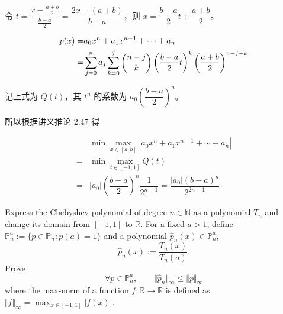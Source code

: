 \documentclass[lang=cn,a4paper,newtx,bibend=bibtex]{elegantpaper}
\begin{document}
\begin{solution}
  令 $t=\dfrac{x-\frac{a+b}2}{\frac{b-a}2}=\dfrac{2x-(a+b)}{b-a}$，则 $x=\dfrac{b-a}2t+\dfrac{a+b}2$。

  \begin{equation*}
  \begin{aligned}
    p(x) = & a_0x^n+a_1x^{n-1}+\cdots+a_n\\
    = & \sum_{j=0}^n a_j\sum_{k=0}^j \dbinom{n-j}k\left(\dfrac{b-a}{2} t\right)^k \left(\dfrac {a+b}2\right)^{n-j-k}
  \end{aligned}
  \end{equation*}
  
  记上式为 $Q(t)$，其 $t^n$ 的系数为 $a_0\left(\dfrac{b-a}2\right)^n$。
  
  所以根据讲义推论 2.47 得
  
  \begin{equation*}
  \begin{aligned}
    & \min \max_{x\in [a,b]} |a_0x^n+a_1x^{n-1}+\cdots+a_n|\\
    = & \min \max_{t\in [-1,1]} Q(t)\\
    = & |a_0|\left(\dfrac{b-a}2\right)^n\dfrac{1}{2^{n-1}} = \dfrac{|a_0|(b-a)^n}{2^{2n-1}}
  \end{aligned}
  \end{equation*}
\end{solution}

\begin{prob}
    Express the Chebyshev polynomial of degree $n\in\mathbb{N}$ as a polynomial $T_n$ and change its domain from $[-1,1]$ to $\mathbb{R}$. For a fixed $a>1$, define $\mathbb{P}_n^a := \{p\in\mathbb{P}_n:p(a)=1\}$ and a polynomial $\hat{p}_n(x)\in\mathbb{P}_n^a$,
    \begin{equation*}
      \hat{p}_n(x) := \frac{T_n(x)}{T_n(a)}.
    \end{equation*}
    Prove
    \begin{equation*}
      \forall p\in \mathbb{P}_n^a,\qquad \Vert \hat{p}_n\Vert_\infty \leq \Vert p\Vert_\infty
    \end{equation*}
    where the max-norm of a function $f:\mathbb{R}\to\mathbb{R}$ is defined as $\Vert f\Vert_\infty = \max_{x\in[-1,1]}\vert f(x)\vert$.  
\end{prob}
\end{document}
